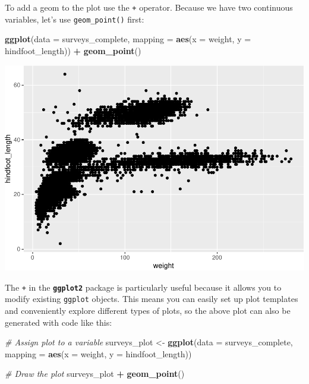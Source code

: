 \documentclass[]{book}
\newenvironment{Shaded}{\begin{snugshade}}{\end{snugshade}}
\newcommand{\KeywordTok}[1]{\textcolor[rgb]{0.13,0.29,0.53}{\textbf{#1}}}
\newcommand{\DataTypeTok}[1]{\textcolor[rgb]{0.13,0.29,0.53}{#1}}
\newcommand{\StringTok}[1]{\textcolor[rgb]{0.31,0.60,0.02}{#1}}
\newcommand{\CommentTok}[1]{\textcolor[rgb]{0.56,0.35,0.01}{\textit{#1}}}
\newcommand{\OperatorTok}[1]{\textcolor[rgb]{0.81,0.36,0.00}{\textbf{#1}}}
\newcommand{\NormalTok}[1]{#1}
\begin{document}
To add a geom to the plot use the \texttt{+} operator. Because we have
two continuous variables, let's use \texttt{geom\_point()} first:

\begin{Shaded}
\begin{Highlighting}[]
\KeywordTok{ggplot}\NormalTok{(}\DataTypeTok{data =}\NormalTok{ surveys_complete, }\DataTypeTok{mapping =} \KeywordTok{aes}\NormalTok{(}\DataTypeTok{x =}\NormalTok{ weight, }\DataTypeTok{y =}\NormalTok{ hindfoot_length)) }\OperatorTok{+}
\StringTok{  }\KeywordTok{geom_point}\NormalTok{()}
\end{Highlighting}
\end{Shaded}

\includegraphics{img/R-ecology-first-ggplot-1.pdf}

The \texttt{+} in the \textbf{\texttt{ggplot2}} package is particularly
useful because it allows you to modify existing \texttt{ggplot} objects.
This means you can easily set up plot templates and conveniently explore
different types of plots, so the above plot can also be generated with
code like this:

\begin{Shaded}
\begin{Highlighting}[]
\CommentTok{# Assign plot to a variable}
\NormalTok{surveys_plot <-}\StringTok{ }\KeywordTok{ggplot}\NormalTok{(}\DataTypeTok{data =}\NormalTok{ surveys_complete, }
                       \DataTypeTok{mapping =} \KeywordTok{aes}\NormalTok{(}\DataTypeTok{x =}\NormalTok{ weight, }\DataTypeTok{y =}\NormalTok{ hindfoot_length))}

\CommentTok{# Draw the plot}
\NormalTok{surveys_plot }\OperatorTok{+}\StringTok{ }
\StringTok{    }\KeywordTok{geom_point}\NormalTok{()}
\end{Highlighting}
\end{Shaded}
\end{document}
